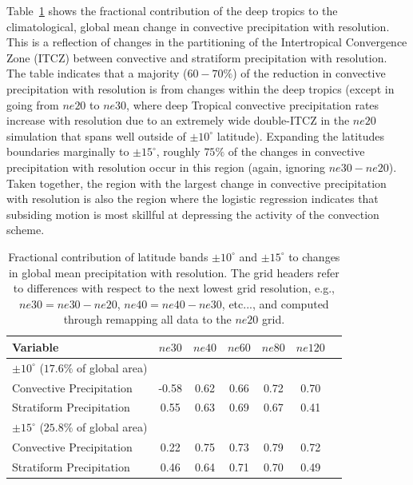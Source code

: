 \documentclass[times]{qjrms4}
\begin{document}
Table~\ref{tbl:table2} shows the fractional contribution of the deep tropics to the climatological, global mean change in convective precipitation with resolution. This is a reflection of changes in the partitioning of the Intertropical Convergence Zone (ITCZ) between convective and stratiform precipitation with resolution. The table indicates that a majority ($60-70 \%$) of the reduction in convective precipitation with resolution is from changes within the deep tropics (except in going from $ne20$ to $ne30$, where deep Tropical convective precipitation rates increase with resolution due to an extremely wide double-ITCZ in the $ne20$ simulation that spans well outside of $\pm 10^{\circ}$ latitude). Expanding the latitudes boundaries marginally to $\pm 15^{\circ}$, roughly $75\%$ of the changes in convective precipitation with resolution occur in this region (again, ignoring $ne30-ne20$). Taken together, the region with the largest change in convective precipitation with resolution is also the region where the logistic regression indicates that subsiding motion is most skillful at depressing the activity of the convection scheme.

 \begin{table}
 \caption{Fractional contribution of latitude bands $\pm 10^{\circ}$ and $\pm 15^{\circ}$ to changes in global mean precipitation with resolution. The grid headers refer to differences with respect to the next lowest grid resolution, e.g., $ne30 = ne30-ne20$, $ne40=ne40-ne30$, etc..., and computed through remapping all data to the $ne20$ grid.}
 \centering
 \scriptsize
 \begin{tabular}{lcccccc}
   \hline
   Variable & $ne30$ & $ne40$ & $ne60$ & $ne80$ & $ne120$ \\ 
   \hline
   $\pm 10^{\circ}$ ($17.6\%$ of global area) \\
   Convective Precipitation & -0.58 & 0.62 & 0.66 & 0.72 & 0.70 \\
   Stratiform Precipitation & 0.55 & 0.63 & 0.69 & 0.67 & 0.41 \\ 
   \hline
   $\pm 15^{\circ}$ ($25.8\%$ of global area) \\
   Convective Precipitation & 0.22 & 0.75 & 0.73 & 0.79 & 0.72 \\
   Stratiform Precipitation & 0.46 & 0.64 & 0.71 & 0.70 & 0.49 \\      
 \hline
 \end{tabular}
 \label{tbl:table2}
 \end{table}
\end{document}
